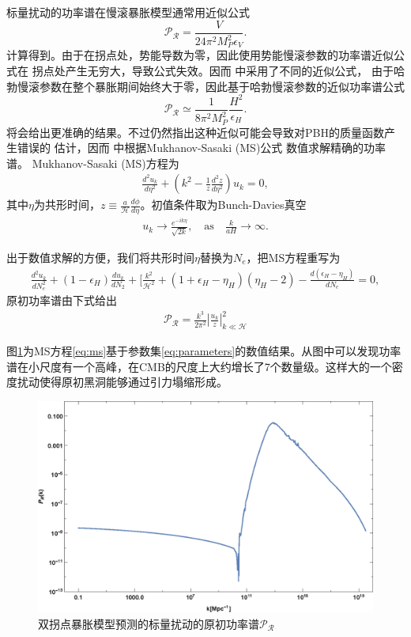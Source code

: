 标量扰动的功率谱在慢滚暴胀模型通常用近似公式
\begin{equation}
  \label{eq:scalar-perturbation-power-spectrum}
  \mathcal{P}_{\mathcal{R}} = \frac{V}{24\pi^2M^2_P\epsilon_V}.
\end{equation}
计算得到。由于在拐点处，势能导数为零，因此使用势能慢滚参数的功率谱近似公式在
拐点处产生无穷大，导致公式失效。因而
\citep{germani2017primordial,motohashi2017primordial}中采用了不同的近似公式，
由于哈勃慢滚参数在整个暴胀期间始终大于零，因此基于哈勃慢滚参数的近似功率谱公式
\begin{equation}
  \label{eq:scalar-perturbation-power-spectrum-hubble}
  \mathcal{P}_{\mathcal{R}} \simeq
  \frac{1}{8\pi^2M^2_P}\frac{H^2}{\epsilon_H}.
\end{equation}
将会给出更准确的结果。不过仍然指出这种近似可能会导致对PBH的质量函数产生错误的
估计，因而 \citep{ballesteros2018primordial}中根据Mukhanov-Sasaki (MS)公式
\citep{sasaki1986large,mukhanov1988quantum}数值求解精确的功率谱。 
Mukhanov-Sasaki (MS)方程为
\begin{align}\label{eq:ms}
    \frac{d^2u_k}{d\eta^2}+\left(k^2-\frac{1}{z}\frac{d^2z}{d\eta^2}\right)u_k=0,
\end{align}
其中$\eta$为共形时间，$z\equiv\frac{a}{\mathcal{H}}\frac{d\phi}{d\eta}$。初值条件取为Bunch-Davies真空\citep{bunch1978quantum}
\begin{align}
    u_k\rightarrow\frac{e^{-ik\eta}}{\sqrt{2k}},\quad\text{as}\quad
    \frac{k}{aH}\rightarrow\infty.
\end{align}

出于数值求解的方便，我们将共形时间$\eta$替换为$N_e$，把MS方程重写为\citep{ballesteros2018primordial}
\begin{align}
    \frac{d^2u_k}{dN^2_e}+\left(1-\epsilon_H\right)\frac{du_k}{dN_2}+
    \lbrack\frac{k^2}{\mathcal{H}^2}+\left(1+\epsilon_H-\eta_H\right)\left(\eta_H-2\right)-\frac{d\left(\epsilon_H-\eta_H\right)}{dN_e}=0,
\end{align}
原初功率谱由下式给出
\begin{align}
    \mathcal{P_R}=\frac{k^3}{2\pi^2}\left\lvert\frac{u_k}{z}\right\rvert^2_{k\ll
    \mathcal{H}}
\end{align}

图\ref{fig:pert}为MS方程\ref{eq:ms}基于参数集\ref{eq:parameters}的数值结果。从图中可以发现功率谱在小尺度有一个高峰，在CMB的尺度上大约增长了7个数量级。这样大的一个密度扰动使得原初黑洞能够通过引力塌缩形成。

\begin{figure}[!htbp]
    \centering
    \includegraphics[width=5in]{Img/pert.eps}
    \caption{双拐点暴胀模型预测的标量扰动的原初功率谱$\mathcal{P_R}$}\label{fig:pert}
\end{figure}
